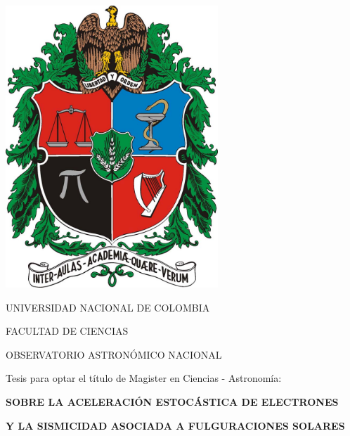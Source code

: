 \begin{center}
\includegraphics[width=0.60\textwidth]{imagenes/escudo.jpg}
\end{center}
\vspace{0.5 cm}
\centerline{\large \sf UNIVERSIDAD NACIONAL DE COLOMBIA}
\centerline{\large \sf FACULTAD DE CIENCIAS}
\centerline{\large \sf OBSERVATORIO ASTRON\'OMICO NACIONAL} 
\vspace{1.0 cm}
{\fontsize{9}{9}\selectfont

\textcolor{1col}{\centerline{\large \sf Tesis para optar el t\'itulo de Magister en Ciencias - Astronom\'ia:}}}

\vspace{0.3 cm}

{\fontsize{9}{9}\selectfont

\textcolor{2col}{\centerline{\large \bf SOBRE LA ACELERACI\'ON ESTOC\'ASTICA DE ELECTRONES}
\vspace{1.4cm}
\centerline {\large \bf Y LA SISMICIDAD ASOCIADA A FULGURACIONES SOLARES}}}


